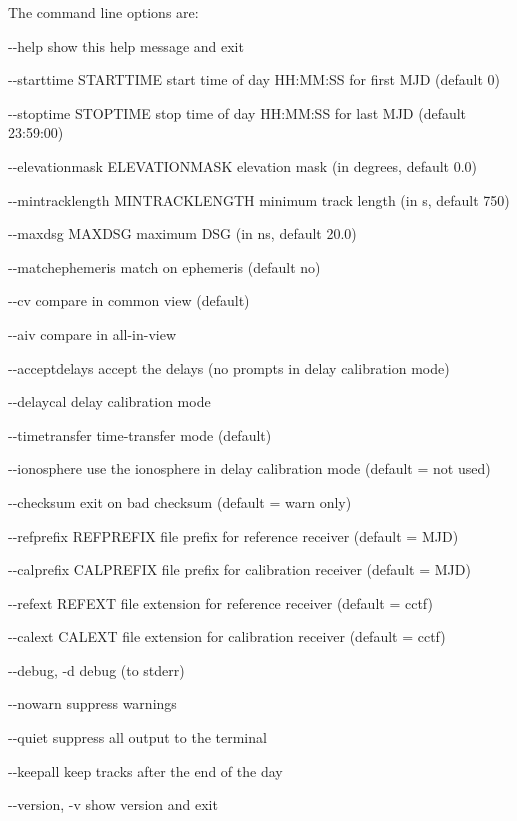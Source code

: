 The command line options are:
\begin{description*}
 \item[-{}-help]            show this help message and exit
 \item[-{}-starttime STARTTIME] start time of day HH:MM:SS for first MJD (default 0)
 \item[-{}-stoptime STOPTIME]   stop time of day HH:MM:SS for last MJD (default 23:59:00)
 \item[-{}-elevationmask ELEVATIONMASK] elevation mask (in degrees, default 0.0)
 \item[-{}-mintracklength MINTRACKLENGTH] minimum track length (in s, default 750)
 \item[-{}-maxdsg MAXDSG]       maximum DSG (in ns, default 20.0)
 \item[-{}-matchephemeris ]     match on ephemeris (default no)
 \item[-{}-cv]                  compare in common view (default)
  \item[-{}-aiv]                 compare in all-in-view
  \item[-{}-acceptdelays]        accept the delays (no prompts in delay calibration mode)
  \item[-{}-delaycal]            delay calibration mode
  \item[-{}-timetransfer]        time-transfer mode (default)
  \item[-{}-ionosphere]          use the ionosphere in delay calibration mode (default = not used)
   \item[-{}-checksum]           exit on bad checksum (default = warn only)
  \item[-{}-refprefix REFPREFIX] file prefix for reference receiver (default = MJD)
  \item[-{}-calprefix CALPREFIX] file prefix for calibration receiver (default = MJD)
  \item[-{}-refext REFEXT]       file extension for reference receiver (default = cctf)
  \item[-{}-calext CALEXT]       file extension for calibration receiver (default = cctf)
  \item[-{}-debug, -d]           debug (to stderr)
  \item[-{}-nowarn]              suppress warnings
  \item[-{}-quiet]               suppress all output to the terminal
  \item[-{}-keepall]             keep tracks after the end of the day
  \item[-{}-version, -v]         show version and exit
\end{description*}

